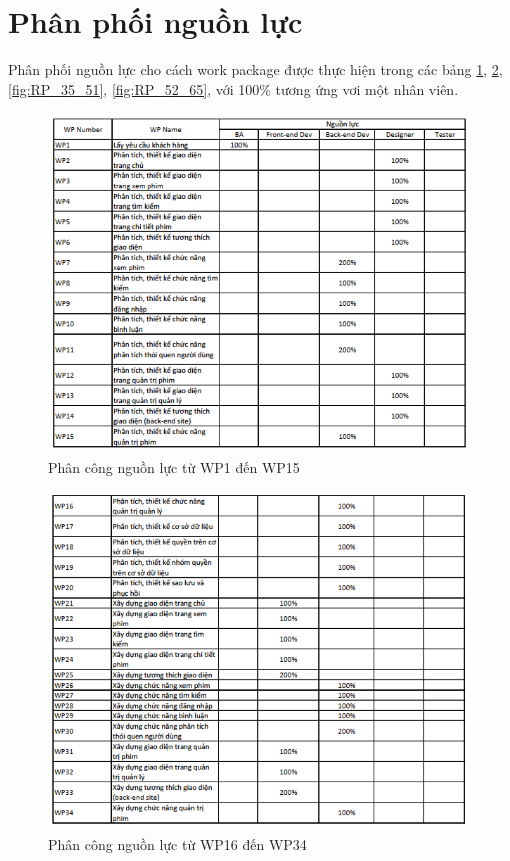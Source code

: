 \documentclass[a4paper]{book}
\begin{document}
\section{Phân phối nguồn lực} Phân phối nguồn lực cho cách work package được thực hiện trong các bảng \ref{fig:RP_1_15}, \ref{fig:RP_16_34}, \ref{fig:RP_35_51}, \ref{fig:RP_52_65}, với 100\% tương ứng vơi một nhân viên.
\begin{figure}[h!]
	\centering
	\includegraphics[width=0.7\textheight]{RP_1_15.png}
	\caption{Phân công nguồn lực từ WP1 đến WP15}
	\label{fig:RP_1_15}
\end{figure}
\begin{figure}[h!]
	\centering
	\includegraphics[width=0.7\textheight]{RP_16_34.png}
	\caption{Phân công nguồn lực từ WP16 đến WP34}
	\label{fig:RP_16_34}
\end{figure}
\end{document}
